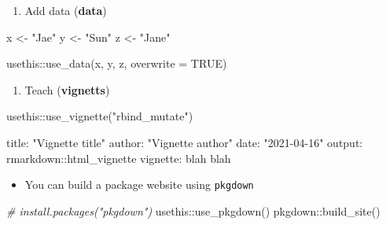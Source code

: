 \documentclass[
]{book}
\newenvironment{Shaded}{\begin{snugshade}}{\end{snugshade}}
\newcommand{\AttributeTok}[1]{\textcolor[rgb]{0.77,0.63,0.00}{#1}}
\newcommand{\CommentTok}[1]{\textcolor[rgb]{0.56,0.35,0.01}{\textit{#1}}}
\newcommand{\ConstantTok}[1]{\textcolor[rgb]{0.00,0.00,0.00}{#1}}
\newcommand{\FunctionTok}[1]{\textcolor[rgb]{0.00,0.00,0.00}{#1}}
\newcommand{\NormalTok}[1]{#1}
\newcommand{\OtherTok}[1]{\textcolor[rgb]{0.56,0.35,0.01}{#1}}
\newcommand{\SpecialCharTok}[1]{\textcolor[rgb]{0.00,0.00,0.00}{#1}}
\newcommand{\StringTok}[1]{\textcolor[rgb]{0.31,0.60,0.02}{#1}}
\providecommand{\tightlist}{%
  \setlength{\itemsep}{0pt}\setlength{\parskip}{0pt}}
\begin{document}
\begin{enumerate}
\def\labelenumi{\arabic{enumi}.}
\setcounter{enumi}{1}
\tightlist
\item
  Add data (\textbf{data})
\end{enumerate}

\begin{Shaded}
\begin{Highlighting}[]
\NormalTok{x }\OtherTok{\textless{}{-}} \StringTok{"Jae"}
\NormalTok{y }\OtherTok{\textless{}{-}} \StringTok{"Sun"}
\NormalTok{z }\OtherTok{\textless{}{-}} \StringTok{"Jane"}

\NormalTok{usethis}\SpecialCharTok{::}\FunctionTok{use\_data}\NormalTok{(x, y, z, }\AttributeTok{overwrite =} \ConstantTok{TRUE}\NormalTok{)}
\end{Highlighting}
\end{Shaded}

\begin{enumerate}
\def\labelenumi{\arabic{enumi}.}
\setcounter{enumi}{2}
\tightlist
\item
  Teach (\textbf{vignetts})
\end{enumerate}

\begin{Shaded}
\begin{Highlighting}[]
\NormalTok{usethis}\SpecialCharTok{::}\FunctionTok{use\_vignette}\NormalTok{(}\StringTok{"rbind\_mutate"}\NormalTok{)}
\end{Highlighting}
\end{Shaded}

\begin{Shaded}
\begin{Highlighting}[]
\NormalTok{title}\SpecialCharTok{:} \StringTok{"Vignette title"}
\NormalTok{author}\SpecialCharTok{:} \StringTok{"Vignette author"}
\NormalTok{date}\SpecialCharTok{:} \StringTok{"2021{-}04{-}16"}
\NormalTok{output}\SpecialCharTok{:}\NormalTok{ rmarkdown}\SpecialCharTok{::}\NormalTok{html\_vignette}
\NormalTok{vignette}\SpecialCharTok{:}\NormalTok{ blah blah}
\end{Highlighting}
\end{Shaded}

\begin{itemize}
\tightlist
\item
  You can build a package website using \texttt{pkgdown}
\end{itemize}

\begin{Shaded}
\begin{Highlighting}[]
\CommentTok{\# install.packages("pkgdown")}
\NormalTok{usethis}\SpecialCharTok{::}\FunctionTok{use\_pkgdown}\NormalTok{()}
\NormalTok{pkgdown}\SpecialCharTok{::}\FunctionTok{build\_site}\NormalTok{()}
\end{Highlighting}
\end{Shaded}
\end{document}
